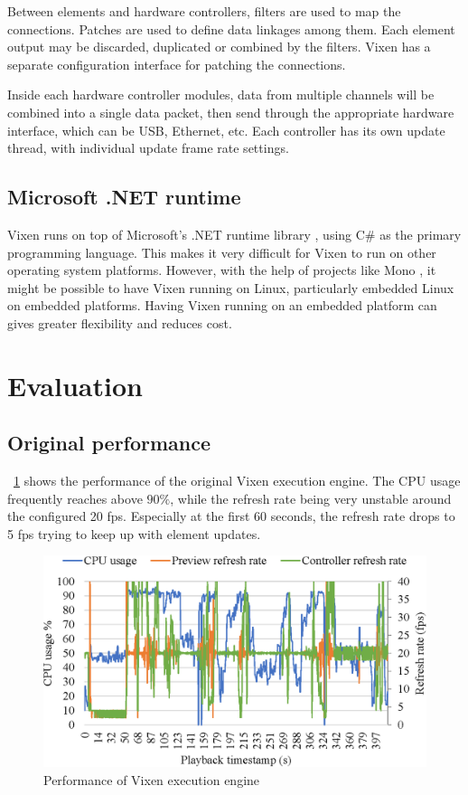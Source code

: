 \documentclass[journal]{IEEEtran}
\newcommand{\fref}[1]{\figurename~\ref{#1}}
\begin{document}
Between elements and hardware controllers, filters are used to map the connections. Patches are used to define data linkages among them. Each element output may be discarded, duplicated or combined by the filters. Vixen has a separate configuration interface for patching the connections.

Inside each hardware controller modules, data from multiple channels will be combined into a single data packet, then send through the appropriate hardware interface, which can be USB, Ethernet, etc. Each controller has its own update thread, with individual update frame rate settings.

\subsection{Microsoft .NET runtime}

Vixen runs on top of Microsoft's .NET runtime library \cite{platt2002introducing}, using C\# \cite{hejlsberg2003c} as the primary programming language. This makes it very difficult for Vixen to run on other operating system platforms. However, with the help of projects like Mono \cite{de2004mono}, it might be possible to have Vixen running on Linux, particularly embedded Linux on embedded platforms. Having Vixen running on an embedded platform can gives greater flexibility and reduces cost.

\section{Evaluation}

\subsection{Original performance}

\fref{fig:original} shows the performance of the original Vixen execution engine. The CPU usage frequently reaches above $90 \%$, while the refresh rate being very unstable around the configured 20 fps. Especially at the first 60 seconds, the refresh rate drops to 5 fps trying to keep up with element updates.

\begin{figure}[t]
    \centering
    \includegraphics[width=0.8\columnwidth]{original}
    \caption{Performance of Vixen execution engine}
    \label{fig:original}
\end{figure}
\end{document}
